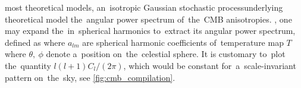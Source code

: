 \DIFdelbegin {}\DIFdelend \DIFaddbegin {}\DIFaddend most theoretical models, \DIFdelbegin {}\DIFdelend \DIFaddbegin {}\DIFaddend an~isotropic Gaussian stochastic process\DIFdelbegin {}\DIFdelend \DIFaddbegin {}\DIFaddend underlying theoretical model \DIFdelbegin {}\DIFdelend \DIFaddbegin {}\DIFaddend the~angular power spectrum of~the~CMB anisotropies. \DIFdelbegin {}\DIFdelend \DIFaddbegin {}\DIFaddend , one may expand the~\DIFdelbegin {}\DIFdelend \DIFaddbegin {}\DIFaddend in~spherical harmonics to~extract its angular power spectrum, defined as \parencite{2015IJMPD..2430004B}
where $a_{lm}$ are spherical harmonic coefficients of~temperature map $T$
where $\theta,\ \phi$  denote a~position on~the~celestial sphere. It is customary to~plot the~quantity $l(l+1)C_l/(2\pi)$, which would be constant for~a~scale-invariant pattern on~the~sky, see \autoref{fig:cmb_compilation}.

